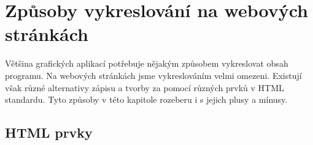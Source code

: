 




\section{Způsoby vykreslování na webových stránkách}

Většina grafických aplikací potřebuje nějakým způsobem vykreslovat obsah programu.
Na webových stránkách jsme vykreslováním velmi omezeni.
Existují však různé alternativy zápisu a tvorby za pomocí různých prvků v HTML standardu.
Tyto způsoby v této kapitole rozeberu i s jejich plusy a mínusy.

\subsection{HTML prvky}

